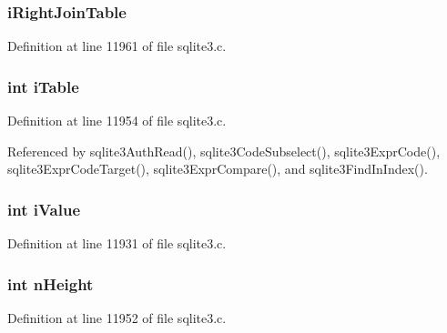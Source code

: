 \hypertarget{struct_expr_a24802f7e7a6c1cdeb6b25b2bad516888}{}
\subsubsection[{i\+Right\+Join\+Table}]{ i\+Right\+Join\+Table}\label{struct_expr_a24802f7e7a6c1cdeb6b25b2bad516888}


Definition at line 11961 of file sqlite3.\+c.

\hypertarget{struct_expr_a3d7171e8cbf2d9cc6743da9da42c8828}{}
\subsubsection[{i\+Table}]{\setlength{\rightskip}{0pt plus 5cm}int i\+Table}\label{struct_expr_a3d7171e8cbf2d9cc6743da9da42c8828}


Definition at line 11954 of file sqlite3.\+c.



Referenced by sqlite3\+Auth\+Read(), sqlite3\+Code\+Subselect(), sqlite3\+Expr\+Code(), sqlite3\+Expr\+Code\+Target(), sqlite3\+Expr\+Compare(), and sqlite3\+Find\+In\+Index().

\hypertarget{struct_expr_ac5de02e20d85842177a764866cef4ad2}{}
\subsubsection[{i\+Value}]{\setlength{\rightskip}{0pt plus 5cm}int i\+Value}\label{struct_expr_ac5de02e20d85842177a764866cef4ad2}


Definition at line 11931 of file sqlite3.\+c.

\hypertarget{struct_expr_a17d981419afeee27eb36a8b43183e49a}{}
\subsubsection[{n\+Height}]{\setlength{\rightskip}{0pt plus 5cm}int n\+Height}\label{struct_expr_a17d981419afeee27eb36a8b43183e49a}


Definition at line 11952 of file sqlite3.\+c.



